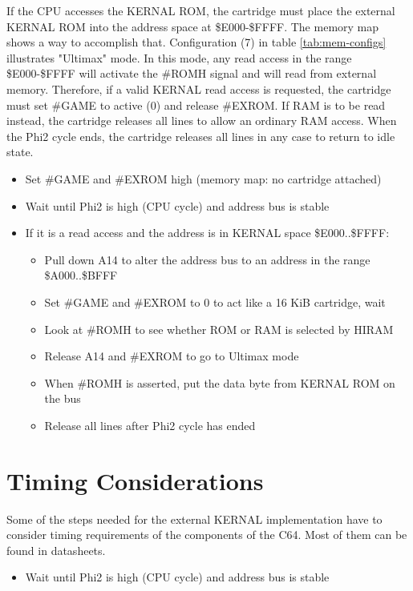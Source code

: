 \documentclass[a4paper,oneside]{memoir}
\begin{document}
If the CPU accesses the KERNAL ROM, the cartridge must place the external KERNAL ROM into the address space at \$E000-\$FFFF.
The memory map shows a way to accomplish that.
Configuration (7) in table \ref {tab:mem-configs} illustrates "Ultimax" mode.
In this mode, any read access in the range \$E000-\$FFFF will activate the \#ROMH signal and will read from external memory.
Therefore, if a valid KERNAL read access is requested, the cartridge must set \#GAME to active (0) and release \#EXROM.
If RAM is to be read instead, the cartridge releases all lines to allow an ordinary RAM access.
When the Phi2 cycle ends, the cartridge releases all lines in any case to return to idle state.

\begin{itemize}
\item Set \#GAME and \#EXROM high (memory map: no cartridge attached)
\item Wait until Phi2 is high (CPU cycle) and address bus is stable
\item If it is a read access and the address is in KERNAL space \$E000..\$FFFF:
    \begin{itemize}
    \item Pull down A14 to alter the address bus to an address in the range \$A000..\$BFFF
    \item Set \#GAME and \#EXROM to 0 to act like a 16 KiB cartridge, wait
    \item Look at \#ROMH to see whether ROM or RAM is selected by HIRAM
    \item Release A14 and \#EXROM to go to Ultimax mode
    \item When \#ROMH is asserted, put the data byte from KERNAL ROM on the bus
    \item Release all lines after Phi2 cycle has ended
    \end{itemize}
\end{itemize}

\section{Timing Considerations}

\label{sec:timing}Some of the steps needed for the external KERNAL implementation have
to consider timing requirements of the components of the C64. 
Most of them can be found in datasheets.

\begin{itemize}
\item Wait until Phi2 is high (CPU cycle) and address bus is stable
\end{itemize}
\end{document}
